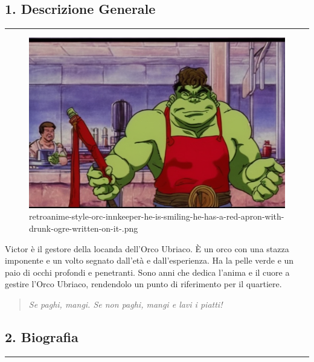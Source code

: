 \subsection{1. Descrizione Generale}\label{descrizione-generale}

\begin{center}\rule{0.5\linewidth}{0.5pt}\end{center}

\begin{figure}
\centering
\includegraphics{retroanime-style-orc-innkeeper-he-is-smiling-he-has-a-red-apron-with-drunk-ogre-written-on-it-.png}
\caption{retroanime-style-orc-innkeeper-he-is-smiling-he-has-a-red-apron-with-drunk-ogre-written-on-it-.png}
\end{figure}

Victor è il gestore della locanda dell'Orco Ubriaco. È un orco con una
stazza imponente e un volto segnato dall'età e dall'esperienza. Ha la
pelle verde e un paio di occhi profondi e penetranti. Sono anni che
dedica l'anima e il cuore a gestire l'Orco Ubriaco, rendendolo un punto
di riferimento per il quartiere.

\begin{quote}
\emph{Se paghi, mangi. Se non paghi, mangi e lavi i piatti!}
\end{quote}

\subsection{2. Biografia}\label{biografia}

\begin{center}\rule{0.5\linewidth}{0.5pt}\end{center}

